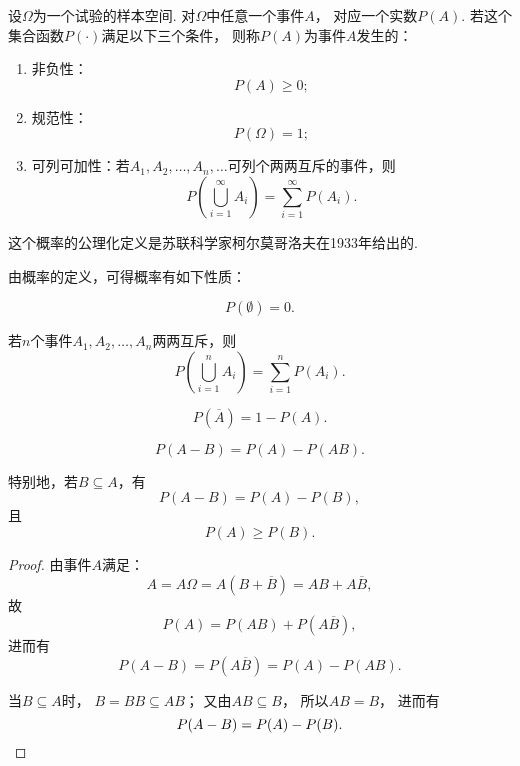\begin{definition}
设\(\Omega\)为一个试验的样本空间.
对\(\Omega\)中任意一个事件\(A\)，
对应一个实数\(P(A)\).
若这个集合函数\(P(\cdot)\)满足以下三个条件，
则称\(P(A)\)为事件\(A\)发生的：
\begin{enumerate}
\item 非负性：\begin{equation}
P(A) \geq 0;
\end{equation}
\item 规范性：\begin{equation}
P(\Omega) = 1;
\end{equation}
\item 可列可加性：若\(A_1,A_2,\dotsc,A_n,\dotsc\)可列个两两互斥的事件，则\begin{equation}
P\left(\bigcup_{i=1}^\infty {A_i}\right)
= \sum\limits_{i=1}^\infty {P(A_i)}.
\end{equation}
\end{enumerate}
\end{definition}
这个概率的公理化定义是苏联科学家柯尔莫哥洛夫在1933年给出的.

由概率的定义，可得概率有如下性质：
\begin{property}
\begin{equation}
P(\emptyset) = 0.
\end{equation}
\end{property}

\begin{property}[有限可加性]
若\(n\)个事件\(A_1,A_2,\dotsc,A_n\)两两互斥，则\begin{equation}
P\left(\bigcup_{i=1}^{n}{A_i}\right)
= \sum\limits_{i=1}^n{P(A_i)}.
\end{equation}
\end{property}

\begin{property}
\begin{equation}
P(\overline{A}) = 1 - P(A).
\end{equation}
\end{property}

\begin{property}[概率的减法]
\begin{equation}
P(A - B) = P(A) - P(AB).
\end{equation}

特别地，若\(B \subseteq A\)，有
\begin{equation}
P(A - B) = P(A) - P(B),
\end{equation}
且
\begin{equation}
P(A) \geq P(B).
\end{equation}

\begin{proof}
由事件\(A\)满足：\[
A = A \Omega
= A(B+\overline{B})
= AB+A\overline{B},
\]故\[
P(A) = P(AB)+P(A\overline{B}),
\]进而有\[
P(A-B) = P(A\overline{B}) = P(A) - P(AB).
\]

当\(B \subseteq A\)时，
\(B = BB \subseteq AB\)；
又由\(AB \subseteq B\)，
所以\(AB = B\)，
进而有\[
P(A-B) = P(A) - P(B).
\qedhere
\]
\end{proof}
\end{property}

